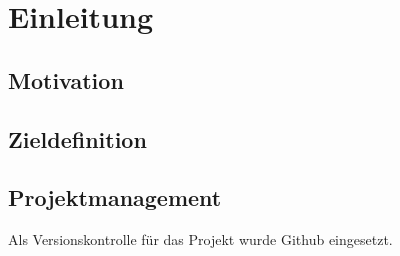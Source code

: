 
\chapter{Einleitung}
\label{sec:Einleitung}
\pagestyle{scrheadings}



\section{Motivation}

\section{Zieldefinition}

\section{Projektmanagement}
Als Versionskontrolle für das Projekt wurde Github eingesetzt.